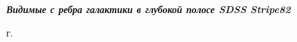 
\begin{titlepage}
\begin{center}
\vspace*{95mm}



\textbf{\textit{\large Видимые с ребра галактики в глубокой полосе SDSS Stripe82}}








\vfill 

\par{\the\year{} г.}
\end{center}
\end{titlepage}
\restoregeometry
\addtocounter{page}{1}
